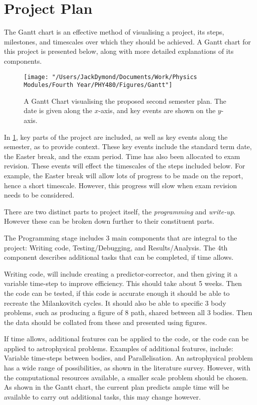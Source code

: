 \documentclass[a4paper,10pt]{article}
\begin{document}
\section{Project Plan}

The Gantt chart is an effective method of visualising a project, its steps, milestones, and timescales over which they should be achieved. A Gantt chart for this project is presented below, along with more detailed explanations of its components.


\begin{figure}[h!]
    \centering
    \texttt{[image: "/Users/JackDymond/Documents/Work/Physics Modules/Fourth Year/PHY480/Figures/Gantt"]}
    \caption{A Gantt Chart visualising the proposed second semester plan. The date is given along the $x$-axis, and key events are shown on the $y$-axis.}
    \label{Gantt}
\end{figure}

In \cref{Gantt}, key parts of the project are included, as well as key events along the semester, as to provide context. These key events include the standard term date, the Easter break, and the exam period. Time has also been allocated to exam revision. These events will effect the timescales of the steps included below. For example, the Easter break will allow lots of progress to be made on the report, hence a short timescale. However, this progress will slow when exam revision needs to be considered.

There are two distinct parts to project itself, the \textit{programming} and \textit{write-up}. However these can be broken down further to their constituent parts.

The Programming stage includes 3 main components that are integral to the project: Writing code, Testing/Debugging, and Results/Analysis. The 4th component describes additional tasks that can be completed, if time allows.

Writing code, will include creating a predictor-corrector, and then giving it a variable time-step to improve efficiency. This should take about 5 weeks. Then the code can be tested, if this code is accurate enough it should be able to recreate the Milankovitch cycles. It should also be able to specific 3 body problems, such as producing a figure of 8 path, shared between all 3 bodies. Then the data should be collated from these and presented using figures.

If time allows, additional features can be applied to the code, or the code can be applied to astrophysical problems. Examples of additional features, include: Variable time-steps between bodies, and Parallelisation. An astrophysical problem has a wide range of possibilities, as shown in the literature survey. However, with the computational resources available, a smaller scale problem should be chosen. As shown in the Gantt chart, the current plan predicts ample time will be available to carry out additional tasks, this may change however.
\end{document}
